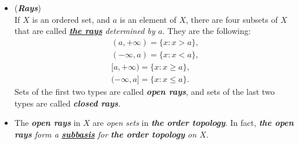 \documentclass[11pt]{article}
\begin{document}
\begin{itemize}
\item \begin{definition}(\emph{\textbf{Rays}})\\
If $X$ is an ordered set, and $a$ is an element of $X$, there are four subsets of $X$ that are called \emph{\textbf{\underline{the rays}} determined by $a$}. They are the following:
\begin{align*}
(a, +\infty) = \{x:  x > a\},\\
(-\infty, a) = \{x:  x < a\},\\
[a, +\infty) = \{x: x \ge a\},\\
(-\infty, a]= \{x: x \le a\}.
\end{align*}
Sets of the first two types are called \emph{\textbf{open rays}}, and sets of the last two types are called \emph{\textbf{closed rays}}.
\end{definition}

\item \begin{remark}
The \emph{\textbf{open rays}} in $X$ are \emph{open sets} in \emph{\textbf{the order topology}}. In fact, \emph{\textbf{the open rays} form a \underline{\textbf{subbasis}} for \textbf{the order topology} on $X$}.
\end{remark}
\end{itemize}
\end{document}
